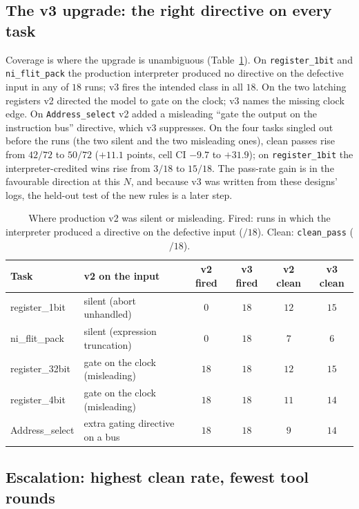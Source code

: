 \documentclass[11pt]{article}
\begin{document}
\subsection{The v3 upgrade: the right directive on every task}
\label{sec:res-v3}

Coverage is where the upgrade is unambiguous (Table~\ref{tab:upgrade}). On
\texttt{register\_1bit} and \texttt{ni\_flit\_pack} the production
interpreter produced no directive on the defective input in any of $18$ runs;
v3 fires the intended class in all $18$. On the two latching registers v2
directed the model to gate on the clock; v3 names the missing clock edge. On
\texttt{Address\_select} v2 added a misleading ``gate the output on the
instruction bus'' directive, which v3 suppresses. On the four tasks singled out
before the runs (the two silent and the two misleading ones), clean passes rise
from $42/72$ to $50/72$ ($+11.1$ points, cell CI $-9.7$ to $+31.9$); on
\texttt{register\_1bit} the interpreter-credited wins rise from $3/18$ to
$15/18$. The pass-rate gain is in the favourable direction at this $N$, and
because v3 was written from these designs' logs, the held-out test of the new
rules is a later step.

\begin{table}[htbp]
\centering
\caption{Where production v2 was silent or misleading. Fired: runs in which
the interpreter produced a directive on the defective input ($/18$).
Clean: \texttt{clean\_pass} ($/18$).}
\label{tab:upgrade}
\small
\begin{tabularx}{\linewidth}{@{} l X c c c c @{}}
\toprule
\textbf{Task} & \textbf{v2 on the input} & \textbf{v2 fired} & \textbf{v3 fired} & \textbf{v2 clean} & \textbf{v3 clean} \\
\midrule
register\_1bit  & silent (abort unhandled)          & $0$  & $18$ & $12$ & $15$ \\
ni\_flit\_pack  & silent (expression truncation)    & $0$  & $18$ & $7$  & $6$ \\
register\_32bit & gate on the clock (misleading)    & $18$ & $18$ & $12$ & $15$ \\
register\_4bit  & gate on the clock (misleading)    & $18$ & $18$ & $11$ & $14$ \\
Address\_select & extra gating directive on a bus   & $18$ & $18$ & $9$  & $14$ \\
\bottomrule
\end{tabularx}
\end{table}

\subsection{Escalation: highest clean rate, fewest tool rounds}
\label{sec:res-esc}
\end{document}
